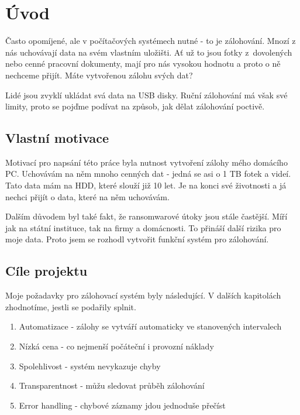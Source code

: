 \documentclass[a4paper,12pt, oneside]{book}
\begin{document}
\tableofcontents

\clearpage
\pagestyle{fancy}

\chapter{Úvod}

Často opomíjené, ale v počítačových systémech nutné - to je zálohování.
Mnozí z nás uchovávají data na svém vlastním uložišti. Ať už to jsou
fotky z dovolených nebo cenné pracovní dokumenty, mají pro nás vysokou hodnotu
a proto o ně nechceme přijít. Máte vytvořenou zálohu svých dat? 

Lidé jsou zvyklí ukládat svá data na USB disky. Ruční zálohování má však své limity,
proto se pojďme podívat na způsob, jak dělat zálohování poctivě.


\section{Vlastní motivace}

Motivací pro napsání této práce byla nutnost vytvoření zálohy mého
domácího PC. Uchovávám na něm mnoho cenných dat -
jedná se asi o 1 TB fotek a videí. Tato data mám na HDD, které
slouží již 10 let. Je na konci své životnosti a já nechci přijít o data,
které na něm uchovávám. 

Dalším důvodem byl také fakt, že ransomwarové útoky jsou stále častější. Míří
jak na státní instituce, tak na firmy a domácnosti. To přináší další rizika pro
moje data. Proto jsem se rozhodl vytvořit funkční systém 
pro zálohování.




\section{Cíle projektu}

Moje požadavky pro zálohovací systém byly následující. V dalších
kapitolách zhodnotíme, jestli se podařily splnit.

\begin{enumerate}
	\item Automatizace - zálohy se vytváří automaticky ve stanovených intervalech
	\item Nízká cena - co nejmenší počáteční i provozní náklady
	\item Spolehlivost - systém nevykazuje chyby
	\item Transparentnost - můžu sledovat průběh zálohování
	\item Error handling - chybové záznamy jdou jednoduše přečíst
\end{enumerate}
\end{document}
